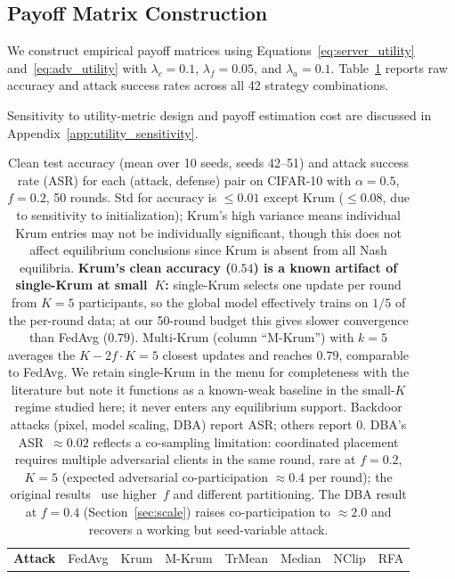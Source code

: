 \documentclass{article}
\begin{document}
\subsection{Payoff Matrix Construction}

We construct empirical payoff matrices using Equations~\ref{eq:server_utility} and~\ref{eq:adv_utility} with $\lambda_c = 0.1$, $\lambda_f = 0.05$, and $\lambda_a = 0.1$. Table~\ref{tab:accuracy} reports raw accuracy and attack success rates across all 42 strategy combinations.

Sensitivity to utility-metric design and payoff estimation cost are discussed in Appendix~\ref{app:utility_sensitivity}.

\begin{table}[t]
\caption{Clean test accuracy (mean over 10 seeds, seeds 42--51) and attack success rate (ASR) for each (attack, defense) pair on CIFAR-10 with $\alpha=0.5$, $f=0.2$, 50 rounds. Std for accuracy is ${\leq}0.01$ except Krum (${\leq}0.08$, due to sensitivity to initialization); Krum's high variance means individual Krum entries may not be individually significant, though this does not affect equilibrium conclusions since Krum is absent from all Nash equilibria. \textbf{Krum's clean accuracy ($0.54$) is a known artifact of single-Krum at small~$K$:} single-Krum selects one update per round from $K{=}5$ participants, so the global model effectively trains on $1/5$ of the per-round data; at our 50-round budget this gives slower convergence than FedAvg ($0.79$). Multi-Krum (column ``M-Krum'') with $k{=}5$ averages the $K-2f \cdot K = 5$ closest updates and reaches $0.79$, comparable to FedAvg. We retain single-Krum in the menu for completeness with the literature but note it functions as a known-weak baseline in the small-$K$ regime studied here; it never enters any equilibrium support. Backdoor attacks (pixel, model scaling, DBA) report ASR; others report 0. DBA's ASR~${\approx}0.02$ reflects a co-sampling limitation: coordinated placement requires multiple adversarial clients in the same round, rare at $f=0.2$, $K=5$ (expected adversarial co-participation ${\approx}0.4$ per round); the original results~\citep{xie2019dba} use higher~$f$ and different partitioning. The DBA result at $f=0.4$ (Section~\ref{sec:scale}) raises co-participation to ${\approx}2.0$ and recovers a working but seed-variable attack.}
\label{tab:accuracy}
\centering
\small
\begin{tabular}{l|ccccccc}
\toprule
\textbf{Attack} & FedAvg & Krum & M-Krum & TrMean & Median & NClip & RFA \\

\end{tabular}
\end{table}
\end{document}
